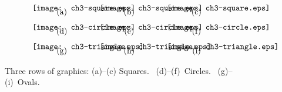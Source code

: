 %
\begin{figure}[!h]%
\[
\begin{gathered}
\hbox to 1in{\texttt{[image: ch3-square.eps]}}
  \quad
\hbox to 1in{\texttt{[image: ch3-square.eps]}}
  \quad
\hbox to 1in{\texttt{[image: ch3-square.eps]}}\\[-10pt]
\hbox to 1in{\hfill(a)\hfill}    \quad 
  \hbox to 1in{\hfill(b)\hfill}  \quad 
  \hbox to 1in{\hfill(c)\hfill}
\end{gathered}
\]
%
\vskip 12pt			%
%
\[
\begin{gathered}
\hbox to 1in{\texttt{[image: ch3-circle.eps]}}
  \quad
\hbox to 1in{\texttt{[image: ch3-circle.eps]}}
  \quad
\hbox to 1in{\texttt{[image: ch3-circle.eps]}}\\[-10pt]
\hbox to 1in{\hfill(d)\hfill}    \quad 
  \hbox to 1in{\hfill(e)\hfill}  \quad 
  \hbox to 1in{\hfill(f)\hfill}
\end{gathered}
\]
%
\vskip 12pt			%
%
\[
\begin{gathered}
\hbox to 1in{\texttt{[image: ch3-triangle.eps]}}
  \quad
\hbox to 1in{\texttt{[image: ch3-triangle.eps]}}
  \quad
\hbox to 1in{\texttt{[image: ch3-triangle.eps]}}\\[-10pt]
\hbox to 1in{\hfill(g)\hfill}    \quad 
  \hbox to 1in{\hfill(h)\hfill}  \quad 
  \hbox to 1in{\hfill(i)\hfill}
\end{gathered}
\]
%
\caption{Three rows of graphics: (a)--(c) Squares. \ (d)--(f)~Circles. \ (g)--(i)~Ovals.}\label{fig:3.2}
\end{figure}
%

